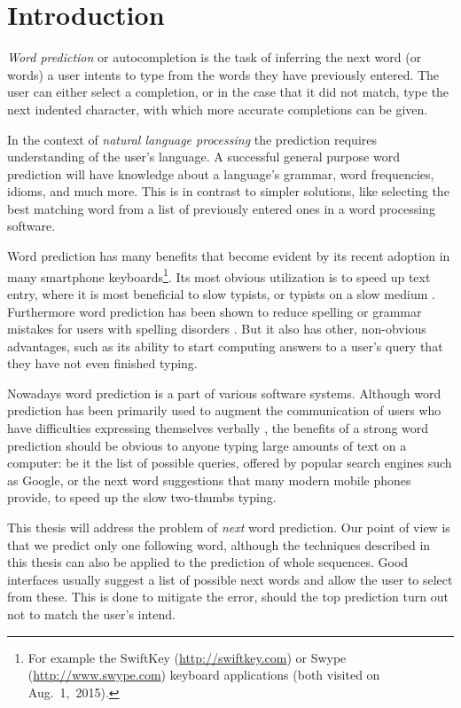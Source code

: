 \chapter{Introduction}
\label{ch:introduction}

\emph{Word prediction} or autocompletion is the task of inferring the next
word (or words) a user intents to type from the words they have previously
entered.
The user can either select a completion, or in the case that it did not
match, type the next indented character, with which more accurate completions
can be given.

In the context of \emph{natural language processing} the prediction requires
understanding of the user's language.
A successful general purpose word prediction will have knowledge about a
language's grammar, word frequencies, idioms, and much more.
This is in contrast to simpler solutions, like selecting the best matching word
from a list of previously entered ones in a word processing software.

Word prediction has many benefits that become evident by its recent adoption
in many smartphone keyboards\footnote{For example the SwiftKey
(\url{http://swiftkey.com}) or Swype (\url{http://www.swype.com}) keyboard
applications (both visited on Aug.~1,~2015).}.
Its most obvious utilization is to speed up text entry, where it is most
beneficial to slow typists, or typists on a slow medium \parencite{Trnka2007}.
Furthermore word prediction has been shown to reduce spelling or grammar
mistakes for users with spelling disorders \parencite{Newell1992}.
But it also has other, non-obvious advantages, such as its ability to start
computing answers to a user's query that they have not even finished
typing\noref.

Nowadays word prediction is a part of various software systems.
Although word prediction has been primarily used to augment the communication of
users who have difficulties expressing themselves verbally
\parencite{Swiffin1987,Trnka2011}, the benefits of a strong word prediction
should be obvious to anyone typing large amounts of text on a computer:
be it the list of possible queries, offered by popular search engines such as
Google, or the next word suggestions that many modern mobile phones provide, to
speed up the slow two-thumbs typing.

This thesis will address the problem of \emph{next} word prediction.
Our point of view is that we predict only one following word, although the
techniques described in this thesis can also be applied to the prediction
of whole sequences.
Good interfaces usually suggest a list of possible next words and allow the
user to select from these.
This is done to mitigate the error, should the top prediction turn out not to
match the user's intend.

